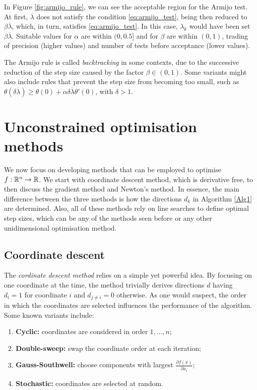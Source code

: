 %
In Figure \ref{fig:armijo_rule}, we can see the acceptable region for the Armijo test. At first, $\overline{\lambda}$ does not satisfy the condition \eqref{eq:armijo_test}, being then reduced to $\beta\overline{\lambda}$, which, in turn, satisfies \eqref{eq:armijo_test}. In this case, $\lambda_k$ would have been set $\beta\overline{\lambda}$. Suitable values for $\alpha$ are within $(0,0.5]$ and for $\beta$ are within $(0,1)$, trading of precision (higher values) and number of tests before acceptance (lower values).

The Armijo rule is called \emph{backtracking} in some contexts, due to the successive reduction of the step size caused by the factor $\beta \in (0,1)$. Some variants might also include rules that prevent the step size from becoming too small, such as $\theta(\delta\overline{\lambda}) \geq \theta(0) + \alpha \delta\overline{\lambda}\theta'(0)$, with $\delta > 1$.
    
\section{Unconstrained optimisation methods}

We now focus on developing methods that can be employed to optimise $f: \mathbb{R}^n \to \mathbb{R}$. We start with coordinate descent method, which is derivative free, to then discuss the gradient method and Newton's method. In essence, the main difference between the three methods is how the directions $d_k$ in Algorithm \ref{Alg1} are determined. Also, all of these methods rely on line searches to define optimal step sizes, which can be any of the methods seen before or any other unidimensional optimisation method.

\subsection{Coordinate descent}

The \emph{cordinate descent method} relies on a simple yet powerful idea. By focusing on one coordinate at the time, the method trivially derives directions $d$ having $d_i = 1$ for coordinate $i$ and $d_{j \neq i} = 0$ otherwise. As one would suspect, the order in which the coordinates are selected influences the performance of the algorithm. Some known variants include:
%
\begin{enumerate}
\item {\bf Cyclic:} coordinates are considered in order $1,\dots,n$;
\item {\bf Double-sweep:} swap the coordinate order at each iteration;
\item {\bf Gauss-Southwell:} choose components with largest $\frac{\partial f(x)}{\partial x_i}$;
\item {\bf Stochastic:} coordinates are selected at random.
\end{enumerate}
  

